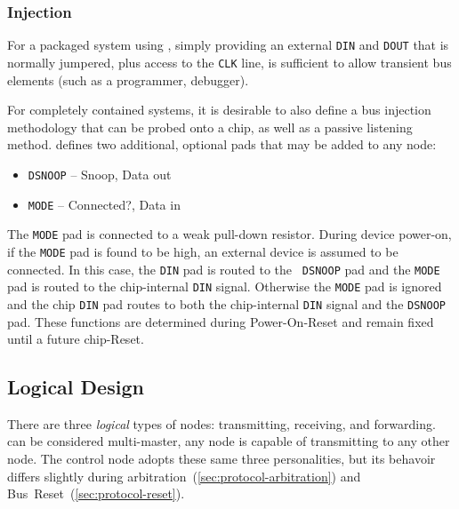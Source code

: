 \subsubsection{Injection}
For a packaged system using \bus, simply providing an external {\tt DIN} and
{\tt DOUT} that is normally jumpered, plus access to the {\tt CLK} line, is
sufficient to allow transient bus elements (such as a programmer, debugger).

For completely contained systems, it is desirable to also define a bus
injection methodology that can be probed onto a chip, as well as a passive
listening method. \bus defines two additional, optional pads that may be added
to any node:

\begin{itemize}
  \item {\tt DSNOOP} -- Snoop, Data out
  \item {\tt MODE}   -- Connected?, Data in
\end{itemize}

The {\tt MODE} pad is connected to a weak pull-down resistor. During device
power-on, if the {\tt MODE} pad is found to be high, an external device is
assumed to be connected. In this case, the {\tt DIN} pad is routed to the {\tt
DSNOOP} pad and the {\tt MODE} pad is routed to the chip-internal {\tt DIN}
signal. Otherwise the {\tt MODE} pad is ignored and the chip {\tt DIN} pad
routes to both the chip-internal {\tt DIN} signal and the {\tt DSNOOP} pad.
These functions are determined during Power-On-Reset and remain fixed until a
future chip-Reset.


\subsection{Logical Design}
\label{sec:logical}

There are three {\em logical} types of \bus nodes: transmitting, receiving,
and forwarding. \bus can be considered multi-master, any node is capable of
transmitting to any other node. The control node adopts these same three
personalities, but its behavoir differs slightly during
arbitration~(\ref{sec:protocol-arbitration}) and
Bus~Reset~(\ref{sec:protocol-reset}).

